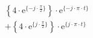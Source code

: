 \[
\begin{split}
&   \left \{ 4 \cdot \textrm{e}^{\{ -j \cdot \frac{\pi}{2} \}} \right \} \cdot \textrm{e}^{\{- j \cdot \pi \cdot t \}}\\
&+  \left \{ 4 \cdot \textrm{e}^{\{  j \cdot \frac{\pi}{2} \}} \right \} \cdot \textrm{e}^{\{  j \cdot \pi \cdot t \}}\\
\end{split}
\]
